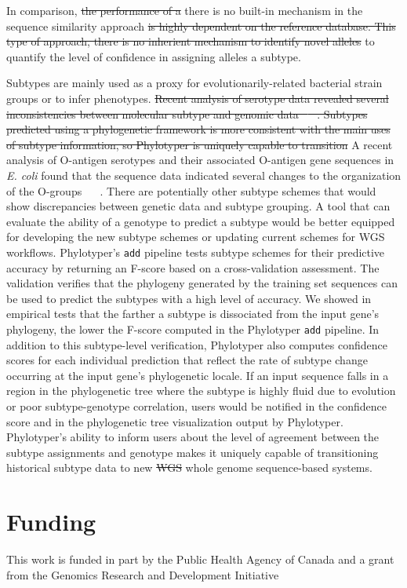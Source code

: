 \documentclass{bioinfo}
\providecommand{\DIFadd}[1]{{\protect\color{red}#1}} %
\providecommand{\DIFdel}[1]{{\protect\color{red}\sout{#1}}}                      %
\providecommand{\DIFaddbegin}{} %
\providecommand{\DIFaddend}{} %
\providecommand{\DIFdelbegin}{} %
\providecommand{\DIFdelend}{} %
\begin{document}
In comparison, \DIFdelbegin \DIFdel{the performance of a }\DIFdelend \DIFaddbegin \DIFadd{there is no built-in mechanism in the }\DIFaddend sequence similarity approach \DIFdelbegin \DIFdel{is highly dependent on the reference database.
This type of approach, there is no inherient mechanism to identify novel alleles }\DIFdelend \DIFaddbegin \DIFadd{to quantify the level of confidence in assigning alleles a subtype}\DIFaddend .

Subtypes are mainly used as a proxy for evolutionarily-related bacterial strain groups or to infer phenotypes.
\DIFdelbegin \DIFdel{Recent analysis of serotype data revealed several inconsistencies between molecular subtype and genomic data \mbox{%
\citep{DebRoy2016}
}%
.
Subtypes predicted using a phylogenetic framework is more consistent with the main uses of subtype information, so 
Phylotyper is uniquely capable to transition }\DIFdelend \DIFaddbegin \DIFadd{A recent analysis of O-antigen serotypes and their associated O-antigen gene sequences in }\textit{\DIFadd{E. coli}} \DIFadd{found that the sequence data indicated several changes to the organization of the O-groups \mbox{%
\citep{DebRoy2016}
}%
.
There are potentially other subtype schemes that would show discrepancies between genetic data and subtype grouping.
A tool that can evaluate the ability of a genotype to predict a subtype would be better equipped for developing the new subtype schemes or updating current schemes for WGS workflows.
Phylotyper's }\texttt{\DIFadd{add}} \DIFadd{pipeline tests subtype schemes for their predictive accuracy by returning an F-score based on a cross-validation assessment.
The validation verifies that the phylogeny generated by the training set sequences can be used to predict the subtypes with a high level of accuracy.
We showed in empirical tests that the farther a subtype is dissociated from the input gene's phylogeny, the lower the F-score computed in the Phylotyper }\texttt{\DIFadd{add}} \DIFadd{pipeline.
In addition to this subtype-level verification, Phylotyper also computes confidence scores for each individual prediction that reflect the rate of subtype change occurring at the input gene's phylogenetic locale.
If an input sequence falls in a region in the phylogenetic tree where the subtype is highly fluid due to evolution or poor subtype-genotype correlation, users would be notified in the confidence score and in the phylogenetic tree visualization output by Phylotyper. 
Phylotyper's ability to inform users about the level of agreement between the subtype assignments and genotype makes it uniquely capable of transitioning }\DIFaddend historical subtype data to new \DIFdelbegin \DIFdel{WGS }\DIFdelend \DIFaddbegin \DIFadd{whole genome sequence-based }\DIFaddend systems.\vspace*{-10pt}


\section*{Funding}

This work is funded in part by the Public Health Agency of Canada and a grant from the Genomics Research and Development Initiative\vspace*{-12pt}




\end{document}
